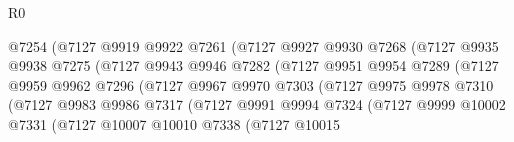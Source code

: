 \begin{lexlean}{R0}
\begin{coremodule}
                                @7254
                                (@7127
                                  @9919
                                  @9922
                                  @7261
                                  (@7127
                                    @9927
                                    @9930
                                    @7268
                                    (@7127
                                      @9935
                                      @9938
                                      @7275
                                      (@7127
                                        @9943
                                        @9946
                                        @7282
                                        (@7127
                                          @9951
                                          @9954
                                          @7289
                                          (@7127
                                            @9959
                                            @9962
                                            @7296
                                            (@7127
                                              @9967
                                              @9970
                                              @7303
                                              (@7127
                                                @9975
                                                @9978
                                                @7310
                                                (@7127
                                                  @9983
                                                  @9986
                                                  @7317
                                                  (@7127
                                                    @9991
                                                    @9994
                                                    @7324
                                                    (@7127
                                                      @9999
                                                      @10002
                                                      @7331
                                                      (@7127
                                                        @10007
                                                        @10010
                                                        @7338
                                                        (@7127
                                                          @10015

\end{coremodule}
\end{lexlean}
